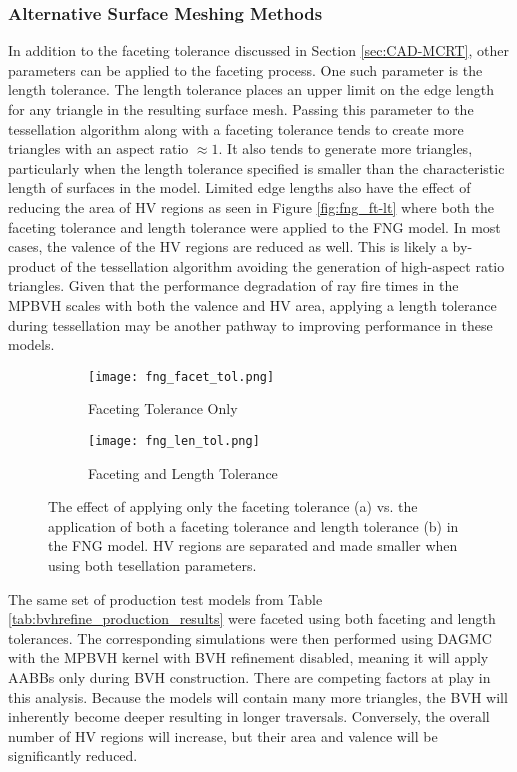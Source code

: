\subsubsection{Alternative Surface Meshing Methods}

In addition to the faceting tolerance discussed in Section \ref{sec:CAD-MCRT},
other parameters can be applied to the faceting process. One such parameter is
the length tolerance. The length tolerance places an upper limit on the edge
length for any triangle in the resulting surface mesh. Passing this parameter to
the tessellation algorithm along with a faceting tolerance tends to create more
triangles with an aspect ratio $\approx 1$.  It also tends to generate more
triangles, particularly when the length tolerance specified is smaller than the
characteristic length of surfaces in the model.  Limited edge lengths also have
the effect of reducing the area of HV regions as seen in Figure
\ref{fig:fng_ft-lt} where both the faceting tolerance and length tolerance were
applied to the FNG model. In most cases, the valence of the HV regions are
reduced as well. This is likely a by-product of the tessellation algorithm
avoiding the generation of high-aspect ratio triangles. Given that the
performance degradation of ray fire times in the MPBVH scales with both the
valence and HV area, applying a length tolerance during tessellation may be
another pathway to improving performance in these models.

\begin{figure}[H]
  \begin{subfigure}[t]{0.48\textwidth}
    \centering
    \texttt{[image: fng\_facet\_tol.png]}
    \caption{Faceting Tolerance Only}
  \end{subfigure}
  \hfill
  \begin{subfigure}[t]{0.48\textwidth}
    \centering
    \texttt{[image: fng\_len\_tol.png]}
    \caption{Faceting and Length Tolerance}
  \end{subfigure}
  \caption[Length tolerance faceting example.]{The effect of applying only the
    faceting tolerance (a) vs. the application of both a faceting tolerance and
    length tolerance (b) in the FNG model. HV regions are separated and made
    smaller when using both tesellation parameters.}
\end{figure}

The same set of production test models from Table
\ref{tab:bvhrefine_production_results} were faceted using both faceting and
length tolerances. The corresponding simulations were then performed using DAGMC
with the MPBVH kernel with BVH refinement disabled, meaning it will apply AABBs
only during BVH construction. There are competing factors at play in this
analysis.  Because the models will contain many more triangles, the BVH will
inherently become deeper resulting in longer traversals. Conversely, the overall
number of HV regions will increase, but their area and valence will be
significantly reduced.

